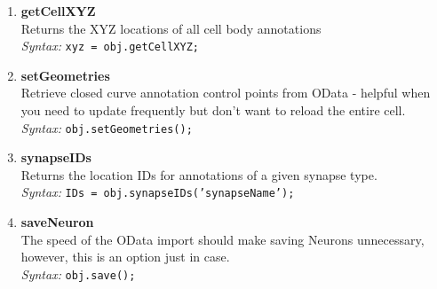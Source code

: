 \documentclass[12pt]{exam}
\begin{document}
\begin{enumerate}
		\item \textbf{getCellXYZ}\\
		Returns the XYZ locations of all cell body annotations\\
		\textit{Syntax:} \texttt{xyz = obj.getCellXYZ;}
		\item \textbf{setGeometries}\\
		Retrieve closed curve annotation control points from OData - helpful when you need to update frequently but don't want to reload the entire cell.\\
		\textit{Syntax:} \texttt{obj.setGeometries();}
		\item \textbf{synapseIDs}\\
		Returns the location IDs for annotations of a given synapse type.\\
		\textit{Syntax:} \texttt{IDs = obj.synapseIDs('synapseName');}
		\item \textbf{saveNeuron}\\
		The speed of the OData import should make saving Neurons unnecessary, however, this is an option just in case.\\
		\textit{Syntax:} \texttt{obj.save();}
	\end{enumerate}
\end{document}
